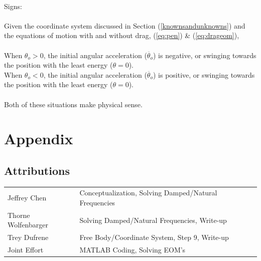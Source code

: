 \documentclass[12pt]{report}
\begin{document}
\begin{flushleft}
~\\
Signs: \\
~\\
Given the coordinate system discussed in Section (\ref{knownsandunknowns}) and the
equations of motion with and without drag, (\ref{eq:pen}) \& (\ref{eq:drageom}), \\
~\\
When $\theta_o > 0$, the initial angular acceleration ($\ddot{\theta_o}$) is negative,
or swinging towards the position with the least energy ($\theta = 0$). \\
When $\theta_o < 0$, the initial angular acceleration ($\ddot{\theta_o}$) is positive,
or swinging towards the position with the least energy ($\theta = 0$). \\
~\\
Both of these situations make physical sense.
\newpage
\section{Appendix} \label{appendix}

\subsection{Attributions}

\onehalfspacing
\begin{tabular}{ll}
Jeffrey Chen & Conceptualization, Solving Damped/Natural Frequencies\\
Thorne Wolfenbarger & Solving Damped/Natural Frequencies, Write-up\\
Trey Dufrene & Free Body/Coordinate System, Step 9, Write-up\\
Joint Effort & MATLAB Coding, Solving EOM's
\end{tabular}
\singlespacing


\end{flushleft}
\end{document}
